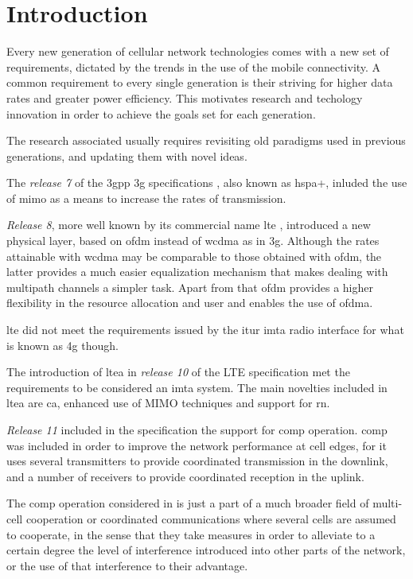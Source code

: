 \chapter{Introduction}\label{ch:intro}

Every new generation of cellular network technologies comes with a new set of
requirements, dictated by the trends in the use of the mobile connectivity. A
common requirement to every single generation is their striving for higher data
rates and greater power efficiency. This motivates research and techology
innovation in order to achieve the goals set for each generation.


The research associated usually requires revisiting old paradigms used in
previous generations, and updating them with novel ideas.


The \emph{release 7} of the \gls{3gpp} \gls{3g} specifications \citep{3Grel7},
also known as \gls{hspa+}, inluded the use of \gls{mimo} as a means to increase
the rates of transmission.


\emph{Release 8}, more well known by its commercial name \gls{lte} \citep{3gpplte},
introduced a new physical layer, based on \gls{ofdm} instead of \gls{wcdma} as in
\gls{3g}. Although the rates attainable with \gls{wcdma} may be comparable to those
obtained with \gls{ofdm}, the latter provides a much easier equalization mechanism
that makes dealing with multipath channels a simpler task. Apart from that \gls{ofdm}
provides a higher flexibility in the resource allocation and user and enables the
use of \gls{ofdma}.

\gls{lte} did not meet the requirements issued by the \gls{itur} \gls{imta} radio
interface \citep{imta} for what is known as \gls{4g} though.

The introduction of \gls{ltea} in \emph{release 10} of the LTE specification
\citep{3gppltea} met the requirements to be considered an \gls{imta} system. The main
novelties included in \gls{ltea} are \gls{ca}, enhanced use of MIMO techniques and support
for \gls{rn}.

\emph{Release 11} \citep{lterel11} included in the specification the support for
\gls{comp} operation. \gls{comp} was included in order to improve the network
performance at cell edges, for it uses several transmitters to provide coordinated
transmission in the downlink, and a number of receivers to provide coordinated
reception in the uplink.

The \gls{comp} operation considered in \citep{lterel11} is just a part of a much
broader field of multi-cell cooperation or coordinated communications where several
cells are assumed to cooperate, in the sense that they take measures in order to
alleviate to a certain degree the level of interference introduced into other parts
of the network, or the use of that interference to their advantage.

